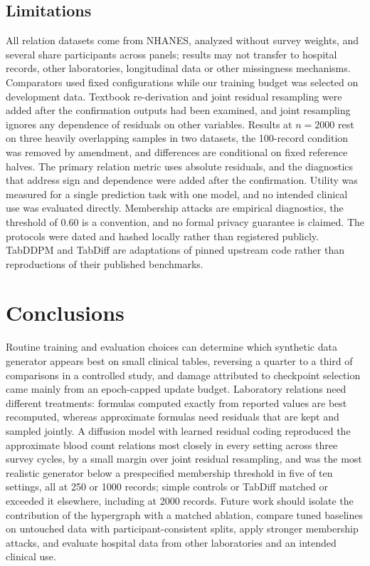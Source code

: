 \documentclass[pdflatex,referee]{sn-jnl}%
\begin{document}
\subsection*{Limitations}

All relation datasets come from NHANES, analyzed without survey weights, and several share participants across panels; results may not transfer to hospital records, other laboratories, longitudinal data or other missingness mechanisms. Comparators used fixed configurations while our training budget was selected on development data. Textbook re-derivation and joint residual resampling were added after the confirmation outputs had been examined, and joint resampling ignores any dependence of residuals on other variables. Results at $n = 2000$ rest on three heavily overlapping samples in two datasets, the 100-record condition was removed by amendment, and differences are conditional on fixed reference halves. The primary relation metric uses absolute residuals, and the diagnostics that address sign and dependence were added after the confirmation. Utility was measured for a single prediction task with one model, and no intended clinical use was evaluated directly. Membership attacks are empirical diagnostics, the threshold of 0.60 is a convention, and no formal privacy guarantee is claimed. The protocols were dated and hashed locally rather than registered publicly. TabDDPM and TabDiff are adaptations of pinned upstream code rather than reproductions of their published benchmarks.

\section*{Conclusions}

Routine training and evaluation choices can determine which synthetic data generator appears best on small clinical tables, reversing a quarter to a third of comparisons in a controlled study, and damage attributed to checkpoint selection came mainly from an epoch-capped update budget. Laboratory relations need different treatments: formulas computed exactly from reported values are best recomputed, whereas approximate formulas need residuals that are kept and sampled jointly. A diffusion model with learned residual coding reproduced the approximate blood count relations most closely in every setting across three survey cycles, by a small margin over joint residual resampling, and was the most realistic generator below a prespecified membership threshold in five of ten settings, all at 250 or 1000 records; simple controls or TabDiff matched or exceeded it elsewhere, including at 2000 records. Future work should isolate the contribution of the hypergraph with a matched ablation, compare tuned baselines on untouched data with participant-consistent splits, apply stronger membership attacks, and evaluate hospital data from other laboratories and an intended clinical use.
\end{document}
